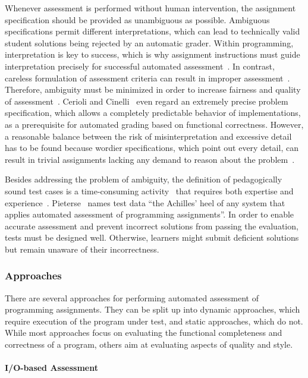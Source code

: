 Whenever assessment is performed without human intervention, the assignment specification should be provided as unambiguous as possible. Ambiguous specifications permit different interpretations, which can lead to technically valid student solutions being rejected by an automatic grader. Within programming, interpretation is key to success, which is why assignment instructions must guide interpretation precisely for successful automated assessment~\cite{douce2005automatic}. In contrast, careless formulation of assessment criteria can result in improper assessment~\cite{pieterse2013automated}. Therefore, ambiguity must be minimized in order to increase fairness and quality of assessment~\cite{renz2014handling}. Cerioli and Cinelli~\cite{cerioli2008grasp} even regard an extremely precise problem specification, which allows a completely predictable behavior of implementations, as a prerequisite for automated grading based on functional correctness. However, a reasonable balance between the risk of misinterpretation and excessive detail has to be found because wordier specifications, which point out every detail, can result in trivial assignments lacking any demand to reason about the problem~\cite{renz2014handling}.

Besides addressing the problem of ambiguity, the definition of pedagogically sound test cases is a time-consuming activity~\cite{cerioli2008grasp} that requires both expertise and experience~\cite{vihavainen2012multi}. Pieterse~\cite{pieterse2013automated} names test data ``the Achilles' heel of any system that applies automated assessment of programming assignments''. In order to enable accurate assessment and prevent incorrect solutions from passing the evaluation, tests must be designed well. Otherwise, learners might submit deficient solutions but remain unaware of their incorrectness.

\subsubsection{Approaches}

There are several approaches for performing automated assessment of programming assignments. They can be split up into dynamic approaches, which require execution of the program under test, and static approaches, which do not. While most approaches focus on evaluating the functional completeness and correctness of a program, others aim at evaluating aspects of quality and style.

\paragraph{I/O-based Assessment}

